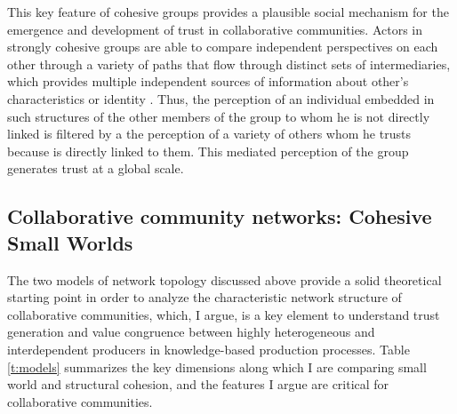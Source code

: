This key feature of cohesive groups provides a plausible social mechanism for the emergence and development of trust in collaborative communities. Actors in strongly cohesive groups are able to compare independent perspectives on each other through a variety of paths that flow through distinct sets of intermediaries, which provides multiple independent sources of information about other's characteristics or identity \citep[320]{white:2001}. Thus, the perception of an individual embedded in such structures of the other members of the group to whom he is not directly linked is filtered by a the perception of a variety of others whom he trusts because is directly linked to them. This mediated perception of the group generates trust at a global scale.

\subsection{Collaborative community networks: Cohesive Small Worlds}

The two models of network topology discussed above provide a solid theoretical starting point in order to analyze the characteristic network structure of collaborative communities, which, I argue, is a key element to understand trust generation and value congruence between highly heterogeneous and interdependent producers in knowledge-based production processes. Table \ref{t:models} summarizes the key dimensions along which I are comparing small world and structural cohesion, and the features I argue are critical for collaborative communities.

